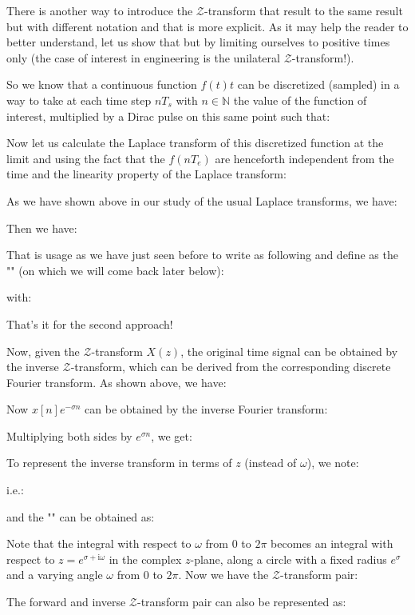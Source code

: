 	
	There is another way to introduce the $\mathcal{Z}$-transform that result to the same result but with different notation and that is more explicit. As it may help the reader to better understand, let us show that but by limiting ourselves to positive times only (the case of interest in engineering is the unilateral $\mathcal{Z}$-transform!).

So we know that a continuous function $f(t)t$ can be discretized (sampled) in a way to take at each time step $nT_s$ with $n\in \mathbb{N}$ the value of the function of interest, multiplied by a Dirac pulse on this same point such that:
	
	Now let us calculate the Laplace transform of this discretized function at the limit and using the fact that the $f(nT_e)$ are henceforth independent from the time and the linearity property of the Laplace transform:
	
	As we have shown above in our study of the usual Laplace transforms, we have:
	
	Then we have:
	
	That is usage as we have just seen before to write as following and define as the "" (on which we will come back later below):
	
	with:
	
	That's it for the second approach!
	
	Now, given the $\mathcal{Z}$-transform $X(z)$, the original time signal can be obtained by the inverse $\mathcal{Z}$-transform, which can be derived from the corresponding discrete Fourier transform. As shown above, we have:
	
	Now $x[n]e^{-\sigma n}$ can be obtained by the inverse Fourier transform:
	
	Multiplying both sides by $e^{\sigma n}$, we get:
	
	To represent the inverse transform in terms of $z$ (instead of $\omega$), we note:
	
	i.e.:
	
	and the "" can be obtained as:
	
	Note that the integral with respect to $\omega$ from $0$ to $2\pi$ becomes an integral with respect to $z=e^{\sigma+\mathrm{i}\omega}$ in the complex $z$-plane, along a circle with a fixed radius $e^\sigma$ and a varying angle $\omega$ from $0$ to $2\pi$. Now we have the $\mathcal{Z}$-transform pair:
	
	
	The forward and inverse $\mathcal{Z}$-transform pair can also be represented as:
	
